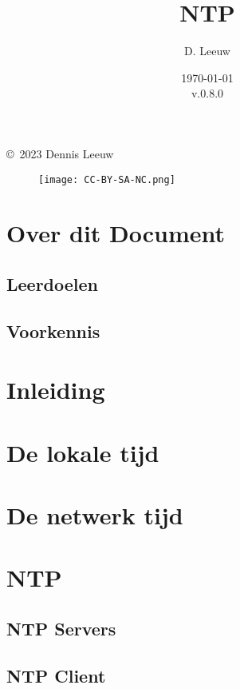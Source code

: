 \documentclass[a4paper,12pt,twoside,openright,titlepage]{book}
\author{D. Leeuw}
\title{NTP}
\date{\today\\v.0.8.0}
\begin{document}

\maketitle

\copyright\ 2023 Dennis Leeuw\\

\begin{figure}
\texttt{[image: CC-BY-SA-NC.png]}
\end{figure}

\bigskip




\frontmatter
\chapter{Over dit Document}
\section{Leerdoelen}

\section{Voorkennis}


\tableofcontents

\mainmatter
\chapter{Inleiding}


\chapter{De lokale tijd}


\chapter{De netwerk tijd}


\chapter{NTP}

\section{NTP Servers}

\section{NTP Client}


\backmatter
\printindex
\end{document}
